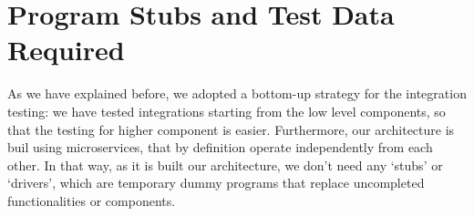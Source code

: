 \pagebreak
\section{Program Stubs and Test Data Required}


As we have explained before, we adopted a bottom-up strategy for the integration testing: we have tested integrations starting from the low level components, so that the testing for higher component is easier. Furthermore, our architecture is buil using microservices, that by definition operate independently from each other. In that way, as it is built our architecture, we don't need any `stubs' or `drivers', which are temporary dummy programs that replace uncompleted functionalities or components.

